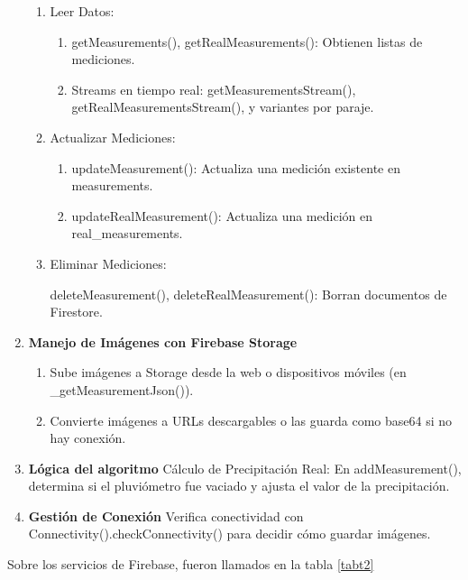 \begin{enumerate}
\begin{enumerate}
    \item Leer Datos:
    
    \begin{enumerate}
    \item getMeasurements(), getRealMeasurements(): Obtienen listas de mediciones.
    
    \item Streams en tiempo real: getMeasurementsStream(), getRealMeasurementsStream(), y variantes por paraje.
    \end{enumerate}
    
    \item Actualizar Mediciones:
    
    \begin{enumerate}
      \item updateMeasurement(): Actualiza una medición existente en measurements.
    
    \item updateRealMeasurement(): Actualiza una medición en real\_measurements.
    \end{enumerate}
    
    \item Eliminar Mediciones:
    
    deleteMeasurement(), deleteRealMeasurement(): Borran documentos de Firestore.
    \end{enumerate}
    
    \item \textbf{Manejo de Imágenes con Firebase Storage}
    \begin{enumerate}
    \item Sube imágenes a Storage desde la web o dispositivos móviles (en \_getMeasurementJson()).
    
    \item Convierte imágenes a URLs descargables o las guarda como base64 si no hay conexión.
    \end{enumerate}
    
    \item \textbf{Lógica del algoritmo}
    Cálculo de Precipitación Real: En addMeasurement(), determina si el pluviómetro fue vaciado y ajusta el valor de la precipitación.
    
    \item \textbf{Gestión de Conexión}
    Verifica conectividad con Connectivity().checkConnectivity() para decidir cómo guardar imágenes.
\end{enumerate}

Sobre los servicios de Firebase, fueron llamados en la tabla \ref{tabt2}


